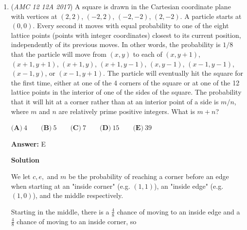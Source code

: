 \begin{enumerate}
 At this point, no more elements can be added to $S$. To see this, let

 
 \begin{align*} a_{n}x^n + a_{n-1}x^{n-1} + ... + a_{2}x^2 + a_{1}x + a_0 &= 0 \\ x(a_{n}x^{n-1} + a_{n-1}x^{n-2} + ... + a_{2}x + a_{1}) + a_0 &= 0 \\ x(a_{n}x^{n-1} + a_{n-1}x^{n-2} + ... + a_{2}x + a_{1}) &= -a_0 \end{align*}


 with each $a_i$ in $S$. $x$ is a factor of $a_0$, and $a_0$ is in $S$, so $x$ has to be a factor of some element in $S$. There are no such integers left, so there can be no additional elements. $\{-10,-5,-2,-1,0,1,2,5,10\}$ has $9$ elements $\to \boxed{\textbf{(D)}}$



	\item (\textit{AMC 12 12A 2017}) A square is drawn in the Cartesian coordinate plane with vertices at $(2, 2)$, $(-2, 2)$, $(-2, -2)$, $(2, -2)$. A particle starts at $(0,0)$. Every second it moves with equal probability to one of the eight lattice points (points with integer coordinates) closest to its current position, independently of its previous moves. In other words, the probability is $1/8$ that the particle will move from $(x, y)$ to each of $(x, y + 1)$, $(x + 1, y + 1)$, $(x + 1, y)$, $(x + 1, y - 1)$, $(x, y - 1)$, $(x - 1, y - 1)$, $(x - 1, y)$, or $(x - 1, y + 1)$. The particle will eventually hit the square for the first time, either at one of the 4 corners of the square or at one of the 12 lattice points in the interior of one of the sides of the square. The probability that it will hit at a corner rather than at an interior point of a side is $m/n$, where $m$ and $n$ are relatively prime positive integers. What is $m + n$?


 $\textbf{(A)}\ 4 \qquad \textbf{(B)}\ 5 \qquad\textbf{(C)}\ 7 \qquad\textbf{(D)}\ 15 \qquad\textbf{(E)}\ 39$

 \textbf{Answer: }E



\textbf{Solution}

We let $c, e,$ and $m$ be the probability of reaching a corner before an edge when starting at an "inside corner" (e.g. $(1, 1)$), an "inside edge" (e.g. $(1, 0)$), and the middle respectively.

 Starting in the middle, there is a $\frac{4}{8}$ chance of moving to an inside edge and a $\frac{4}{8}$ chance of moving to an inside corner, so


\end{enumerate}
